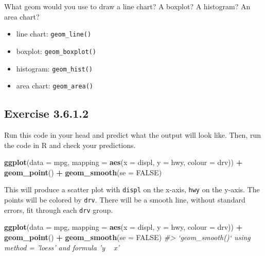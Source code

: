 \documentclass[]{book}
\newenvironment{Shaded}{\begin{snugshade}}{\end{snugshade}}
\newcommand{\CommentTok}[1]{\textcolor[rgb]{0.56,0.35,0.01}{\textit{#1}}}
\newcommand{\DataTypeTok}[1]{\textcolor[rgb]{0.13,0.29,0.53}{#1}}
\newcommand{\KeywordTok}[1]{\textcolor[rgb]{0.13,0.29,0.53}{\textbf{#1}}}
\newcommand{\NormalTok}[1]{#1}
\newcommand{\OperatorTok}[1]{\textcolor[rgb]{0.81,0.36,0.00}{\textbf{#1}}}
\newcommand{\OtherTok}[1]{\textcolor[rgb]{0.56,0.35,0.01}{#1}}
\newcommand{\StringTok}[1]{\textcolor[rgb]{0.31,0.60,0.02}{#1}}
\providecommand{\tightlist}{%
  \setlength{\itemsep}{0pt}\setlength{\parskip}{0pt}}
\theoremstyle{plain}
\theoremstyle{remark}
\begin{document}
What geom would you use to draw a line chart? A boxplot? A histogram? An
area chart?

\begin{itemize}
\tightlist
\item
  line chart: \texttt{geom\_line()}
\item
  boxplot: \texttt{geom\_boxplot()}
\item
  histogram: \texttt{geom\_hist()}
\item
  area chart: \texttt{geom\_area()}
\end{itemize}

\hypertarget{exercise-3.6.1.2}{%
\subsection*{\texorpdfstring{Exercise
{3.6.1.2}}{Exercise 3.6.1.2}}\label{exercise-3.6.1.2}}

Run this code in your head and predict what the output will look like.
Then, run the code in R and check your predictions.

\begin{Shaded}
\begin{Highlighting}[]
\KeywordTok{ggplot}\NormalTok{(}\DataTypeTok{data =}\NormalTok{ mpg, }\DataTypeTok{mapping =} \KeywordTok{aes}\NormalTok{(}\DataTypeTok{x =}\NormalTok{ displ, }\DataTypeTok{y =}\NormalTok{ hwy, }\DataTypeTok{colour =}\NormalTok{ drv)) }\OperatorTok{+}
\StringTok{  }\KeywordTok{geom_point}\NormalTok{() }\OperatorTok{+}
\StringTok{  }\KeywordTok{geom_smooth}\NormalTok{(}\DataTypeTok{se =} \OtherTok{FALSE}\NormalTok{)}
\end{Highlighting}
\end{Shaded}

This will produce a scatter plot with \texttt{displ} on the x-axis,
\texttt{hwy} on the y-axis. The points will be colored by \texttt{drv}.
There will be a smooth line, without standard errors, fit through each
\texttt{drv} group.

\begin{Shaded}
\begin{Highlighting}[]
\KeywordTok{ggplot}\NormalTok{(}\DataTypeTok{data =}\NormalTok{ mpg, }\DataTypeTok{mapping =} \KeywordTok{aes}\NormalTok{(}\DataTypeTok{x =}\NormalTok{ displ, }\DataTypeTok{y =}\NormalTok{ hwy, }\DataTypeTok{colour =}\NormalTok{ drv)) }\OperatorTok{+}
\StringTok{  }\KeywordTok{geom_point}\NormalTok{() }\OperatorTok{+}
\StringTok{  }\KeywordTok{geom_smooth}\NormalTok{(}\DataTypeTok{se =} \OtherTok{FALSE}\NormalTok{)}
\CommentTok{#> `geom_smooth()` using method = 'loess' and formula 'y ~ x'}
\end{Highlighting}
\end{Shaded}
\end{document}
